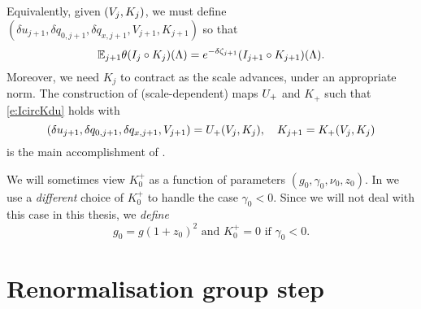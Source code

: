 Equivalently, given $(V_j, K_j)$, we must define
$(\delta u_{j+1}, \delta q_{0,j+1}, \delta q_{x,j+1}, V_{j+1}, K_{j+1})$ so that
\begin{equation} \label{e:IcircKdu}
	\mathbb{E}_{j+1}\theta(I_j \circ K_j)(\Lambda)
	=
	e^{-\delta \zeta_{j+1}}(I_{j+1} \circ K_{j+1})(\Lambda).
\end{equation}
Moreover, we need $K_j$ to contract as the scale advances, under an appropriate norm.
The construction of (scale-dependent) maps $U_+$ and $K_+$ such that
\eqref{e:IcircKdu} holds with
\begin{equation}
(\delta u_{j+1}, \delta q_{0,j+1}, \delta q_{x,j+1}, V_{j+1})
	=
U_+(V_j, K_j),
	\quad
K_{j+1} =  K_+(V_j, K_j)
\end{equation}
is the main accomplishment of \cite{BS-rg-step}.

\begin{rk}
We will sometimes view $K^+_0$ as a function of parameters $(g_0, \gamma_0, \nu_0, z_0)$.
In \cite{BSW-saw-sa} we use a \emph{different} choice of $K^+_0$ to handle the
case $\gamma_0 < 0$. Since we will not deal with this case in this thesis, we
\emph{define}
\begin{equation}
g_0 = g (1 + z_0)^2
	\text{ and }
K^+_0 = 0
	\text{ if }
\gamma_0 < 0.
\end{equation}
\end{rk}


\section{Renormalisation group step}
\label{sec:step}

